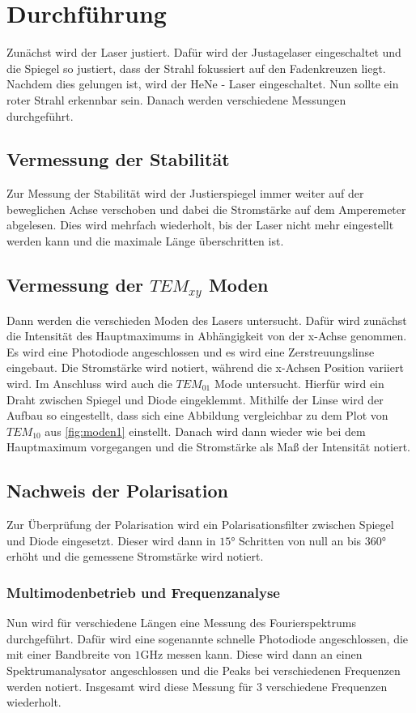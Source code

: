 \section{Durchführung}
\label{sec:Durchführung}

Zunächst wird der Laser justiert.
Dafür wird der Justagelaser eingeschaltet und die Spiegel so justiert, dass der Strahl fokussiert auf den Fadenkreuzen liegt.
Nachdem dies gelungen ist, wird der HeNe - Laser eingeschaltet.
Nun sollte ein roter Strahl erkennbar sein.
Danach werden verschiedene Messungen durchgeführt.

\subsection*{Vermessung der Stabilität}
Zur Messung der Stabilität wird der Justierspiegel immer weiter auf der beweglichen Achse verschoben und dabei die Stromstärke auf dem Amperemeter abgelesen.
Dies wird mehrfach wiederholt, bis der Laser nicht mehr eingestellt werden kann und die maximale Länge überschritten ist.

\subsection*{Vermessung der $TEM_{xy}$ Moden}
Dann werden die verschieden Moden des Lasers untersucht.
Dafür wird zunächst die Intensität des Hauptmaximums in Abhängigkeit von der x-Achse genommen.
Es wird eine Photodiode angeschlossen und es wird eine Zerstreuungslinse eingebaut.
Die Stromstärke wird notiert, während die x-Achsen Position variiert wird.
Im Anschluss wird auch die $TEM_{01}$ Mode untersucht.
Hierfür wird ein Draht zwischen Spiegel und Diode eingeklemmt.
Mithilfe der Linse wird der Aufbau so eingestellt, dass sich eine Abbildung vergleichbar zu dem Plot von $TEM_{10}$ aus \autoref{fig:moden1} einstellt.
Danach wird dann wieder wie bei dem Hauptmaximum vorgegangen und die Stromstärke als Maß der Intensität notiert.

\subsection*{Nachweis der Polarisation}
Zur Überprüfung der Polarisation wird ein Polarisationsfilter zwischen Spiegel und Diode eingesetzt.
Dieser wird dann in $15°$ Schritten von null an bis $360°$ erhöht und die gemessene Stromstärke wird notiert.

\subsubsection*{Multimodenbetrieb und Frequenzanalyse}
Nun wird für verschiedene Längen eine Messung des Fourierspektrums durchgeführt.
Dafür wird eine sogenannte schnelle Photodiode angeschlossen, die mit einer Bandbreite von $1 \unit{\giga\hertz}$ messen kann.
Diese wird dann an einen Spektrumanalysator angeschlossen und die Peaks bei verschiedenen Frequenzen werden notiert.
Insgesamt wird diese Messung für 3 verschiedene Frequenzen wiederholt.

